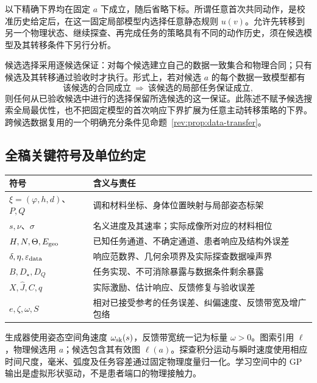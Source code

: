 \documentclass[11pt,a4paper]{article}
\numberwithin{equation}{section}
\theoremstyle{definition}
\begin{document}
以下精确下界均在固定 $a$ 下成立，随后省略下标。所谓任意首次共同动作，是校准历史给定后，在这一固定局部模型内选择任意静态规则 $u(v)$。允许先转移到另一个物理状态、继续探查、再完成任务的策略具有不同的动作历史，须在候选模型及其转移条件下另行分析。

候选选择采用逐候选保证：对每个候选建立自己的数据一致集合和物理合同；只有候选及其转移通过验收时才执行。形式上，若对候选 $a$ 的每个数据一致模型都有
\begin{equation}
 \text{该候选的合同成立}
 \ \Longrightarrow\
 \text{该候选的局部任务保证成立},
 \label{rev:eq:per-candidate-quantifier}
\end{equation}
则任何从已验收候选中进行的选择保留所选候选的这一保证。此陈述不赋予候选搜索全局最优性，也不把固定模型的首次响应下界扩展为任意主动转移策略的下界。跨候选数据复用的一个明确充分条件见命题~\ref{rev:prop:data-transfer}。

\subsection{全稿关键符号及单位约定}
\begin{center}\small
\begin{tabularx}{\linewidth}{lY}
\toprule
符号 & 含义与责任\\
\midrule
$\xi=(\varphi,h,d)$、$P,Q$ & 调和材料坐标、身体位置映射与局部姿态标架\\
$s,\nu$、$\sigma$ & 名义进度及其速率；实际成像所对应的材料相位\\
$H,N,\Theta,E_{\rm geo}$ & 已知任务通道、不确定通道、患者响应及结构外误差\\
$\delta,\eta,\varepsilon_{\rm data}$ & 响应范数界、几何余项界及实际探查数据噪声界\\
$B,D_\star,D_Q$ & 任务实现、不可消除暴露与数据条件剩余暴露\\
$X,\widehat J,C,q$ & 实际激励、估计响应、反馈修复与验收误差\\
$e,\zeta,\omega,S$ & 相对已接受参考的任务误差、纠偏速度、反馈带宽及增广包络\\
\bottomrule
\end{tabularx}\end{center}
生成器使用姿态空间角速度 $\omega_{\rm sk}(s)$，反馈带宽统一记为标量 $\omega>0$。图索引用 $\ell$，物理候选用 $a$；候选包含其有效图 $\ell(a)$。探查积分运动与瞬时速度使用相应时间尺度，毫米、弧度及任务容差通过固定物理度量归一化。学习空间中的 GP 输出是虚拟形状驱动，不是患者端口的物理接触力。
\end{document}
